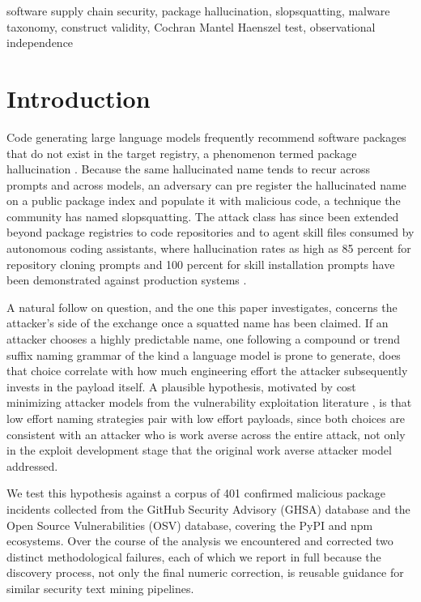 \documentclass[journal]{IEEEtran}
\begin{document}
\begin{IEEEkeywords}
software supply chain security, package hallucination, slopsquatting, malware taxonomy, construct validity, Cochran Mantel Haenszel test, observational independence
\end{IEEEkeywords}

\section{Introduction}

Code generating large language models frequently recommend software packages that do not exist in the target registry, a phenomenon termed package hallucination \cite{spracklen2024}. Because the same hallucinated name tends to recur across prompts and across models, an adversary can pre register the hallucinated name on a public package index and populate it with malicious code, a technique the community has named slopsquatting. The attack class has since been extended beyond package registries to code repositories and to agent skill files consumed by autonomous coding assistants, where hallucination rates as high as 85 percent for repository cloning prompts and 100 percent for skill installation prompts have been demonstrated against production systems \cite{spira2026}.

A natural follow on question, and the one this paper investigates, concerns the attacker's side of the exchange once a squatted name has been claimed. If an attacker chooses a highly predictable name, one following a compound or trend suffix naming grammar of the kind a language model is prone to generate, does that choice correlate with how much engineering effort the attacker subsequently invests in the payload itself. A plausible hypothesis, motivated by cost minimizing attacker models from the vulnerability exploitation literature \cite{allodi2021}, is that low effort naming strategies pair with low effort payloads, since both choices are consistent with an attacker who is work averse across the entire attack, not only in the exploit development stage that the original work averse attacker model addressed.

We test this hypothesis against a corpus of 401 confirmed malicious package incidents collected from the GitHub Security Advisory (GHSA) database and the Open Source Vulnerabilities (OSV) database, covering the PyPI and npm ecosystems. Over the course of the analysis we encountered and corrected two distinct methodological failures, each of which we report in full because the discovery process, not only the final numeric correction, is reusable guidance for similar security text mining pipelines.
\end{document}
